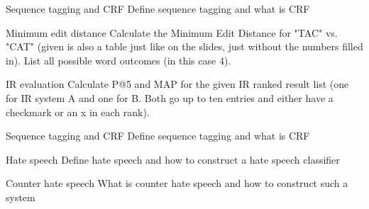 \documentclass{article}
\begin{document}
\begin{exercise}{Sequence tagging and CRF}
  Define sequence tagging and what is CRF

  \begin{solution}
  \end{solution}
\end{exercise}

\begin{exercise}{Minimum edit distance}
  Calculate the Minimum Edit Distance for "TAC" vs. "CAT" (given is also a table just like on the slides, just without the numbers filled in). List all possible word outcomes (in this case 4).

  \begin{solution}
  \end{solution}
\end{exercise}

\begin{exercise}{IR evaluation}
  Calculate P@5 and MAP for the given IR ranked result list (one for IR system A and one for B. Both go up to ten entries and either have a checkmark or an x in each rank).

  \begin{solution}
  \end{solution}
\end{exercise}

\begin{exercise}{Sequence tagging and CRF}
  Define sequence tagging and what is CRF

  \begin{solution}
  \end{solution}
\end{exercise}

\begin{exercise}{Hate speech}
  Define hate speech and how to construct a hate speech classifier

  \begin{solution}
  \end{solution}
\end{exercise}

\begin{exercise}{Counter hate speech}
  What is counter hate speech and how to construct such a system

  \begin{solution}
  \end{solution}
\end{exercise}
\end{document}
